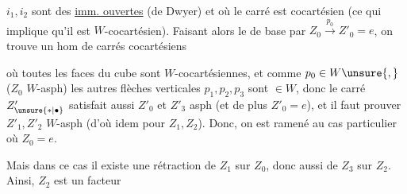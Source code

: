
$i_1,i_2$ sont des \uline{imm. ouvertes} (de Dwyer) et où le carré est cocartésien (ce qui implique qu'il est $W$-cocartésien). Faisant alors le  de base par $Z_0\xrightarrow{p_0}Z'_0=e$, on trouve un  hom de carrés cocartésiens


où toutes les faces du cube sont $W$-cocartésiennes, et comme $p_0\in W\unsure{,}$ ($Z_0$  $W$-asph) les autres flèches verticales $p_1,p_2,p_3$ sont $\in W$, donc le carré $Z'_{\unsure{*|\bullet}}$ satisfait aussi $Z'_0$ et $Z'_3$ asph (et de plus $Z'_0=e$), et il faut prouver $Z'_1,Z'_2$ $W$-asph (d'où idem pour $Z_1,Z_2$). Donc, on est ramené au cas particulier où $Z_0=e$.

Mais dans ce cas il existe une rétraction  de $Z_1$ sur $Z_0$, donc aussi de $Z_3$ sur $Z_2$. Ainsi, $Z_2$ est un facteur
